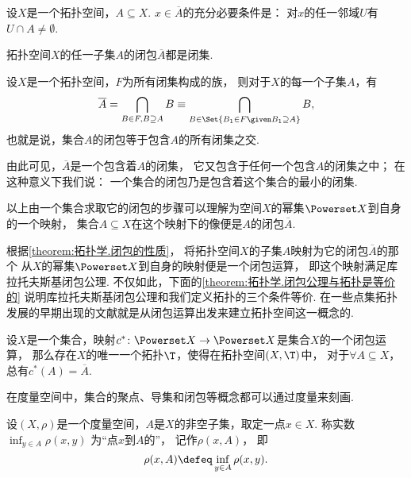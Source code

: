 \begin{property}\label{theorem:拓扑学.一点属于闭包的充分必要条件}
设\(X\)是一个拓扑空间，\(A \subseteq X\).
\(x \in \overline{A}\)的充分必要条件是：
对\(x\)的任一邻域\(U\)有\(U \cap A \neq \emptyset\).
\end{property}

\begin{corollary}\label{theorem:拓扑学.拓扑空间子集闭包都是闭集}
拓扑空间\(X\)的任一子集\(A\)的闭包\(\overline{A}\)都是闭集.
\end{corollary}

\begin{theorem}\label{theorem:拓扑学.集合的闭包是含有该集的最小闭集}
设\(X\)是一个拓扑空间，\(F\)为所有闭集构成的族，
则对于\(X\)的每一个子集\(A\)，有\[
\overline{A}
= \bigcap_{B \in F, B \supseteq A} B
\equiv \bigcap_{B \in \Set{ B_1 \in F \given B_1 \supseteq A}} B,
\]
也就是说，集合\(A\)的闭包等于包含\(A\)的所有闭集之交.
\end{theorem}
由此可见，\(\overline{A}\)是一个包含着\(A\)的闭集，
它又包含于任何一个包含\(A\)的闭集之中；
在这种意义下我们说：
一个集合的闭包乃是包含着这个集合的最小的闭集.

以上由一个集合求取它的闭包的步骤可以理解为空间\(X\)的幂集\(\Powerset X\)到自身的一个映射，
集合\(A \subseteq X\)在这个映射下的像便是\(A\)的闭包\(\overline{A}\).



根据\cref{theorem:拓扑学.闭包的性质}，
将拓扑空间\(X\)的子集\(A\)映射为它的闭包\(\overline{A}\)的那个
从\(X\)的幂集\(\Powerset X\)到自身的映射便是一个闭包运算，
即这个映射满足库拉托夫斯基闭包公理.
不仅如此，下面的\cref{theorem:拓扑学.闭包公理与拓扑是等价的}
说明库拉托夫斯基闭包公理和我们定义拓扑的三个条件等价.
在一些点集拓扑发展的早期出现的文献就是从闭包运算出发来建立拓扑空间这一概念的.

\begin{theorem}\label{theorem:拓扑学.闭包公理与拓扑是等价的}
设\(X\)是一个集合，映射\(c^*\colon \Powerset X \to \Powerset X\)是集合\(X\)的一个闭包运算，
那么存在\(X\)的唯一一个拓扑\(\T\)，使得在拓扑空间\((X,\T)\)中，
对于\(\forall A \subseteq X\)，总有\(c^*(A) = \overline{A}\).
\end{theorem}

在度量空间中，集合的聚点、导集和闭包等概念都可以通过度量来刻画.

\begin{definition}\label{definition:拓扑学.点到点集的距离}
\def\d{\inf_{y \in A} \rho(x,y)}%
设\((X,\rho)\)是一个度量空间，\(A\)是\(X\)的非空子集，取定一点\(x \in X\).
称实数\(\d\)
为“点\(x\)到\(A\)的”，
记作\(\rho(x,A)\)，
即\[
	\rho(x,A) \defeq \d.
\]
\end{definition}

